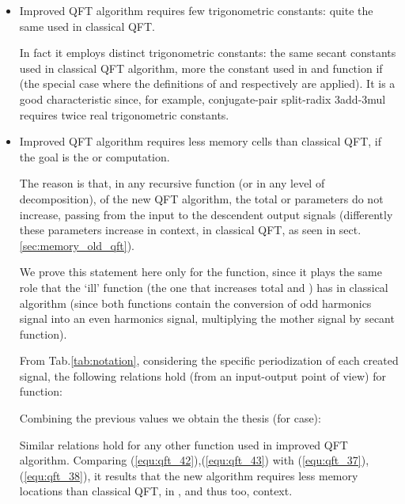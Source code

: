 \documentclass[a4paper,10pt]{article}
\begin{document}
\begin{itemize}
\item 
Improved QFT algorithm requires few trigonometric constants: quite the same used in classical QFT.

In fact it employs  distinct trigonometric constants: the same  secant constants used in classical QFT algorithm, more the  constant used in  and  function if  (the special case where the definitions of  and  respectively are applied).
It is a good characteristic since, for example, conjugate-pair split-radix 3add-3mul requires twice real trigonometric constants. 


\item
Improved QFT algorithm requires less memory cells than classical QFT, if the goal is the  or  computation.

The reason is that, in any recursive function (or in any level of decomposition), of the new QFT algorithm, the total  or  parameters do not increase, passing from the input to the descendent output signals (differently these parameters increase in  context, in classical QFT, as seen in sect. \ref{sec:memory_old_qft}).

We prove this statement here only for the  function, since it plays the same role that the `ill'  function (the one that increases total  and ) has in classical algorithm (since both functions contain the conversion of odd harmonics signal into an even harmonics signal, multiplying the mother signal by secant function).



From Tab.\ref{tab:notation}, considering the
specific periodization of each created signal, the following relations hold (from an input-output point of view) for  function:

Combining the previous values we obtain the thesis (for  case):

Similar relations hold for any other function used in improved QFT algorithm.
Comparing (\ref{equ:qft_42}),(\ref{equ:qft_43}) with (\ref{equ:qft_37}),(\ref{equ:qft_38}), it results that the new algorithm requires
less memory locations than classical QFT, in , and thus  too, context.


\end{itemize}
\end{document}

